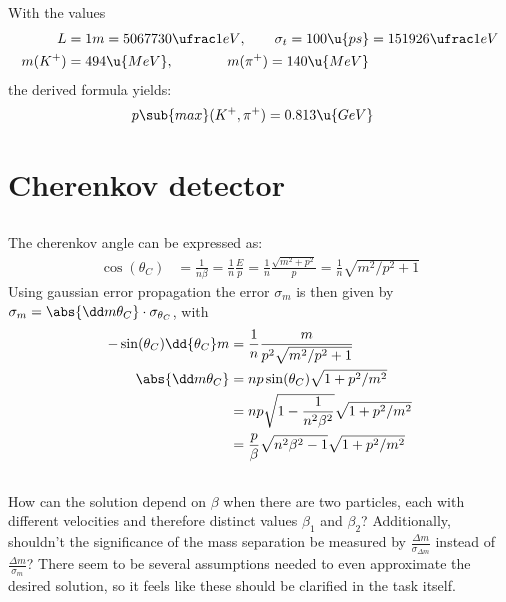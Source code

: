 \documentclass[exb, en]{exercise_5.0}
\begin{document}
\subsection{}
With the values 
\begin{align*}
    L &= 1m = 5067730 \ufrac1{eV}, \qquad 
    \sigma_t = 100\u{ps} = 151926\ufrac1{eV}\\
    m(K^+) &= 494\u{MeV}, \quad\, \ \  \qquad m(\pi^+) = 140\u{MeV}
\end{align*}
the derived formula yields:
\begin{align*}
    p\sub{max}(K^+,\pi^+) &= 0.813\u{GeV}
\end{align*}

\section{Cherenkov detector}
\subsection{}
The cherenkov angle can be expressed as:
\begin{align*}
    \cos(\theta_C) &= \frac1{n\beta} 
    = \frac1n \frac{E}{p}
    = \frac1n \frac{\sqrt{m^2 + p^2}}{p} = \frac1n \sqrt{m^2/p^2 + 1}
\end{align*}
Using gaussian error propagation the error $\sigma_m$ is then given by $\sigma_m = \abs{\dd m{\theta_C}}\cdot \sigma_{\theta_C}$, with 
\begin{align*}
    -\sin(\theta_C) \dd{\theta_C}m &= \frac1n \frac{m}{p^2\sqrt{m^2/p^2 + 1}}
    \\
    \abs{\dd m{\theta_C}} 
    &= np\sin(\theta_C)\sqrt{1 + p^2/m^2}\\
    &= np\sqrt{1- \frac1{n^2\beta^2}}\sqrt{1 + p^2/m^2}\\
    &= \frac{p}{\beta}\sqrt{n^2\beta^2- 1}\sqrt{1 + p^2/m^2}\\
\end{align*}

\subsection{}
How can the solution depend on $\beta$ when there are two particles, each with different velocities and therefore distinct values $\beta_1$ and $\beta_2$? Additionally, shouldn't the significance of the mass separation be measured by $\frac{\Delta m}{\sigma_{\Delta m}}$ instead of $\frac{\Delta m}{\sigma_m}$? There seem to be several assumptions needed to even approximate the desired solution, so it feels like these should be clarified in the task itself.
\end{document}
